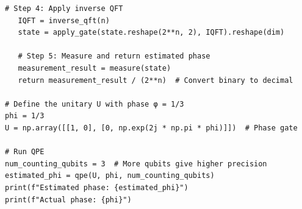 \documentclass{beamer}
\begin{document}
\begin{frame}
\begin{Verbatim}[numbers=none,fontsize=\fontsize{9pt}{9pt},baselinestretch=0.95]
   # Step 4: Apply inverse QFT
   IQFT = inverse_qft(n)
   state = apply_gate(state.reshape(2**n, 2), IQFT).reshape(dim)

   # Step 5: Measure and return estimated phase
   measurement_result = measure(state)
   return measurement_result / (2**n)  # Convert binary to decimal

# Define the unitary U with phase φ = 1/3
phi = 1/3
U = np.array([[1, 0], [0, np.exp(2j * np.pi * phi)]])  # Phase gate

# Run QPE
num_counting_qubits = 3  # More qubits give higher precision
estimated_phi = qpe(U, phi, num_counting_qubits)
print(f"Estimated phase: {estimated_phi}")
print(f"Actual phase: {phi}")

\end{Verbatim}
\end{frame}
\end{document}

